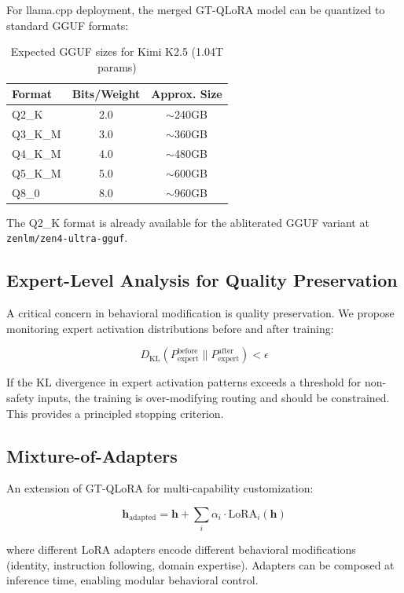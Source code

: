 \documentclass[11pt,a4paper]{article}
\begin{document}
For llama.cpp deployment, the merged GT-QLoRA model can be quantized to standard GGUF formats:

\begin{table}[h]
\centering
\caption{Expected GGUF sizes for Kimi K2.5 (1.04T params)}
\label{tab:gguf}
\begin{tabular}{lcc}
\toprule
\textbf{Format} & \textbf{Bits/Weight} & \textbf{Approx. Size} \\
\midrule
Q2\_K & 2.0 & $\sim$240GB \\
Q3\_K\_M & 3.0 & $\sim$360GB \\
Q4\_K\_M & 4.0 & $\sim$480GB \\
Q5\_K\_M & 5.0 & $\sim$600GB \\
Q8\_0 & 8.0 & $\sim$960GB \\
\bottomrule
\end{tabular}
\end{table}

The Q2\_K format is already available for the abliterated GGUF variant at \texttt{zenlm/zen4-ultra-gguf}.

\subsection{Expert-Level Analysis for Quality Preservation}

A critical concern in behavioral modification is quality preservation. We propose monitoring expert activation distributions before and after training:

$$D_{\text{KL}}(P_{\text{expert}}^{\text{before}} \| P_{\text{expert}}^{\text{after}}) < \epsilon$$

If the KL divergence in expert activation patterns exceeds a threshold for non-safety inputs, the training is over-modifying routing and should be constrained. This provides a principled stopping criterion.

\subsection{Mixture-of-Adapters}

An extension of GT-QLoRA for multi-capability customization:

$$\mathbf{h}_{\text{adapted}} = \mathbf{h} + \sum_{i} \alpha_i \cdot \text{LoRA}_i(\mathbf{h})$$

where different LoRA adapters encode different behavioral modifications (identity, instruction following, domain expertise). Adapters can be composed at inference time, enabling modular behavioral control.
\end{document}
